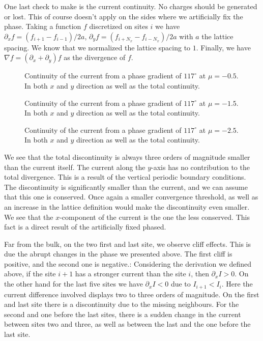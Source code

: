 \documentclass[..\main.tex]{subfile}
\begin{document}
One last check to make is the current continuity. No charges should be generated or lost. This of course doesn't apply on
the sides where we artificially fix the phase. Taking a function $f$ discretized on sites $i$ we have $\partial_x f = (f_{i+1} - f_{i-1} )/2a$,
$\partial_y f = (f_{i+N_x} - f_{i-N_x} )/2a$ with
$a$ the lattice spacing. We know that we normalized the lattice spacing to $1$. Finally, we have $\nabla f = (\partial_x + \partial_y) f$ as the divergence
of $f$.
\begin{figure}[H]
    \centering
    
    \caption{Continuity of the current from a phase gradient of $117^{\circ}$ at $\mu = -0.5$. In both $x$ and $y$ direction as
    well as the total continuity.}
\end{figure}
\begin{figure}[H]
    \centering
    
    \caption{Continuity of the current from a phase gradient of $117^{\circ}$ at $\mu = -1.5$. In both $x$ and $y$ direction as
    well as the total continuity.}
\end{figure}
\begin{figure}[H]
    \centering
    
    \caption{Continuity of the current from a phase gradient of $117^{\circ}$ at $\mu = -2.5$. In both $x$ and $y$ direction as
    well as the total continuity.}
\end{figure}
We see that the total discontinuity is always three orders of magnitude smaller than the current itself. 
The current along the $y$-axis has no contribution to the total divergence. This is a result of the vertical periodic boundary conditions.
The discontinuity is
significantly smaller than the current, and we can assume that this one is conserved. Once again a smaller convergence threshold,
as well as an increase in the lattice definition would make the discontinuity even smaller.
We see that the $x$-component of the current is the one the less conserved. This fact is a direct result of the artificially fixed phased.

Far from the bulk, on the two first and last site, we observe cliff effects. This is due the abrupt changes in the phase we presented above.
The first cliff is positive, and the second one is negative.:
Considering the derivation we defined above, if the site $i+1$ has a stronger current than the site $i$, then $\partial_x I > 0$.
On the other hand for the last five sites we have $\partial_x I <0$ due to $I_{i+1}< I_i$. Here the current difference involved displays two to three orders of magnitude.
On the first and last site there is a discontinuity due to the missing neighbours. For the second and one before the last sites, there is a sudden change in the current
between sites two and three, as well as between the last and the one before the last site.\\
\end{document}
